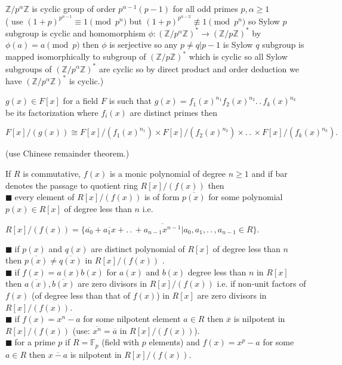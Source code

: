 \documentclass[11pt]{extarticle}
\newcommand{\ra}{\rightarrow}
\newcommand{\Z}{\mathbb{Z}}
\newcommand{\ck}{.\,.\,}
\newcommand{\tm}{\times}
\newcommand{\snote}[1]{{\footnotesize(#1)}}
\newcommand{\tbx}[2][]{
	\begin{tcolorbox}[enhanced,breakable,size=small,colback=black!2!white,title={#1},arc is angular, arc=1.5mm,drop fuzzy shadow]
		#2
	\end{tcolorbox}
}
\newcommand{\y}{$\blacksquare\;$}
\begin{document}
\begin{multicols}{2}
\tbx{$ \Z/p^\alpha\Z $ is cyclic group of order $ p^{\alpha-1}(p-1) $ for all odd primes $ p, \alpha \geq 1$ \\
	\snote{ use $ (1+p)^{p^{n-1}}\equiv 1 \pmod p^n $ but $ (1+p)^{p^{n-2}}	\not\equiv 1 \pmod p^n $ so Sylow $ p $ subgroup is cyclic and homomorphism  $ \phi : (\Z/p^\alpha\Z )^*\ra (\Z/p\Z )^*$ by $ \phi(a) = a \pmod p $ then $ \phi $ is serjective so any $ p\neq q| p-1 $ is Sylow $q$ subgroup is mapped isomorphically to subgroup of $ (\Z/p\Z )^*$ which is cyclic so all Sylow subgroups of $(\Z/p^\alpha\Z )^*$ are cyclic so by direct product and order deduction we have $ (\Z/p^\alpha\Z )^* $ is cyclic.}}
	
	\tbx{  $ g(x) \in F[x] $ for a field $ F $ is such that $ g(x)=f_1(x)^{n_1} f_2(x)^{n_2}\ck f_k(x)^{n_k}$ be its factorization where $ f_i(x) $ are distinct primes then 
		\begin{center}
			$ F[x]/(g(x))\cong F[x]/(f_1(x)^{n_1})\tm F[x]/(f_2(x)^{n_2})\tm \ck \tm F[x]/(f_k(x)^{n_k}) .$
		\end{center}  \snote{use Chinese remainder theorem.}
	} 
		\tbx{  If $ R $ is commutative, $ f(x) $ is a monic polynomial of degree $ n\geq 1 $ and if bar  denotes the passage to quotient ring $ R[x]/(f(x)) $ then\\
		\y every element of $ R[x]/(f(x)) $ is of form $ \overline{p(x)} $ for some polynomial $ p(x) \in R[x]$ of degree less than $ n $ i.e.\\
		\begin{center}
			$ R[x]/(f(x))=\{\overline{a_0}+\overline{a_1x}+\ck+\overline{a_{n-1}x^{n-1}}|a_0,a_1,\ck ,a_{n-1}\in R\} .$
		\end{center} 
		\y if $ p(x) $ and $ q(x) $ are distinct polynomial of $ R[x] $ of degree less than $ n $ then $ \overline{p(x)}\neq \overline{q(x)} $ in $ R[x]/(f(x)) $ .\\
		\y if $ f(x)=a(x)b(x)$ for $ a(x) $ and $ b(x) $ degree less than $ n $ in $ R[x] $ then $ \overline{a(x)},\overline{b(x)} $ are zero divisors in $ R[x]/(f(x)) $ i.e. if non-unit factors of $ f(x) $ \snote{of degree less than that of $ f(x) $} in $ R[x] $ are zero divisors in $ R[x]/(f(x)) $.\\
		\y if $ f(x)=x^n-a $ for some nilpotent element $ a \in R$ then $ \overline{x} $ is nilpotent in $ R[x]/(f(x)) $ \snote{use: $ \overline{x^n}=\overline{a} $ in $ R[x]/(f(x)) $}.\\
		\y for a prime $ p $ if $ R=\mathbb{F}_p $ \snote{field with $ p $ elements} and $ f(x)=x^p-a $ for some $ a\in R $ then $ \overline{x-a} $ is nilpotent in $ R[x]/(f(x)) $.}

\end{multicols}
\end{document}
